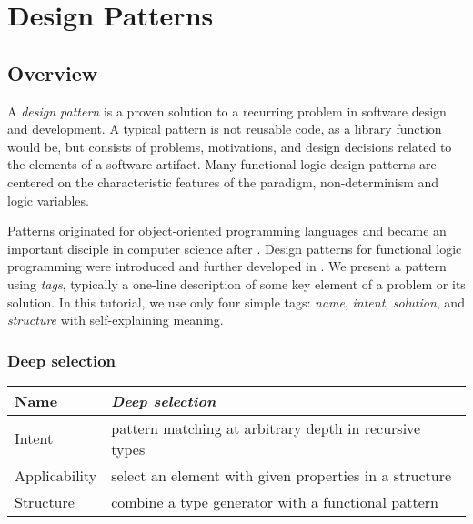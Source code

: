 \chapter{Design Patterns}

\section{Overview}

A \emph{design pattern}
is a proven solution to a recurring
problem in software design and development.
A typical pattern is not reusable code, as a library function would be,
but consists of problems, motivations, and design decisions
related to the elements of a software artifact.
Many functional logic design patterns are centered on the characteristic
features of the paradigm, non-determinism and logic variables.

Patterns originated for object-oriented programming languages
and became an important disciple in computer
science after \cite{GammaEtAl94}.
Design patterns for functional logic programming
were introduced and further developed in
\cite{AntoyHanus02FLOPS,AntoyHanus11WFLP}.
We present a pattern using \emph{tags},
typically a one-line description of some key element
of a problem or its solution.
In this tutorial, we use only four simple tags:
\emph{name},
\emph{intent},
\emph{solution}, and
\emph{structure}
with self-explaining meaning.

\subsection{Deep selection}\label{sec-Deep-selection}

\begin{center}
\begin{tabular}{@{} | *{2}{@{\hspace{3pt}} l @{\hspace{3pt}} |} @{}}
\hline
Name & \emph{Deep selection} \\
\hline 
Intent & pattern matching at arbitrary depth in recursive types \\
\hline
Applicability & select an element with given properties in a structure \\
\hline
Structure & combine a type generator with a functional pattern \\
\hline
\end{tabular}
\end{center}

